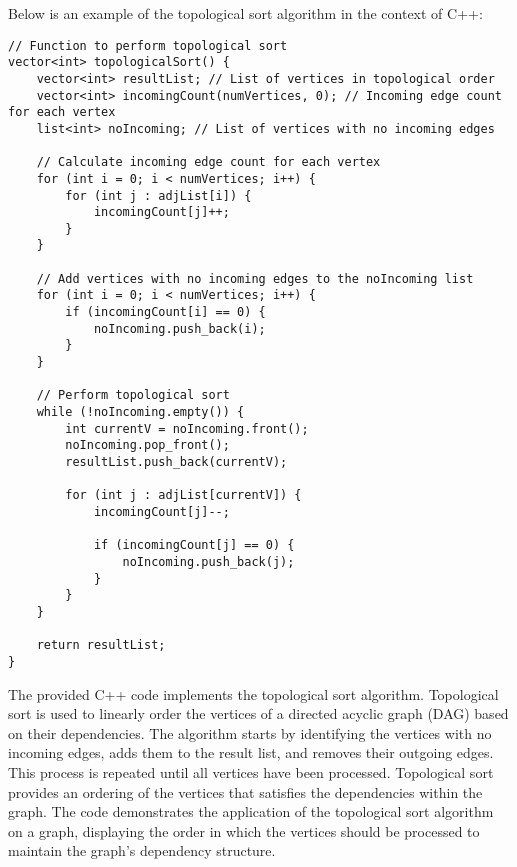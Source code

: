 \begin{solution}

Below is an example of the topological sort algorithm in the context of C++:

\horizontalline

\begin{verbatim}
// Function to perform topological sort
vector<int> topologicalSort() {
    vector<int> resultList; // List of vertices in topological order
    vector<int> incomingCount(numVertices, 0); // Incoming edge count for each vertex
    list<int> noIncoming; // List of vertices with no incoming edges

    // Calculate incoming edge count for each vertex
    for (int i = 0; i < numVertices; i++) {
        for (int j : adjList[i]) {
            incomingCount[j]++;
        }
    }

    // Add vertices with no incoming edges to the noIncoming list
    for (int i = 0; i < numVertices; i++) {
        if (incomingCount[i] == 0) {
            noIncoming.push_back(i);
        }
    }

    // Perform topological sort
    while (!noIncoming.empty()) {
        int currentV = noIncoming.front();
        noIncoming.pop_front();
        resultList.push_back(currentV);

        for (int j : adjList[currentV]) {
            incomingCount[j]--;

            if (incomingCount[j] == 0) {
                noIncoming.push_back(j);
            }
        }
    }

    return resultList;
}
\end{verbatim}

\horizontalline

The provided C++ code implements the topological sort algorithm. Topological sort is used to linearly order the vertices of a directed acyclic graph (DAG) based on their dependencies. The algorithm starts by identifying the 
vertices with no incoming edges, adds them to the result list, and removes their outgoing edges. This process is repeated until all vertices have been processed. Topological sort provides an ordering of the vertices that satisfies 
the dependencies within the graph. The code demonstrates the application of the topological sort algorithm on a graph, displaying the order in which the vertices should be processed to maintain the graph's dependency structure.
    
\end{solution}


